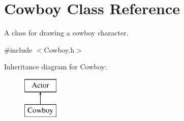 \hypertarget{classCowboy}{}\section{Cowboy Class Reference}
\label{classCowboy}


A class for drawing a cowboy character.  




{\ttfamily \#include $<$Cowboy.\+h$>$}

Inheritance diagram for Cowboy\+:\begin{figure}[H]
\begin{center}
\leavevmode
\includegraphics[height=2.000000cm]{classCowboy}
\end{center}
\end{figure}
